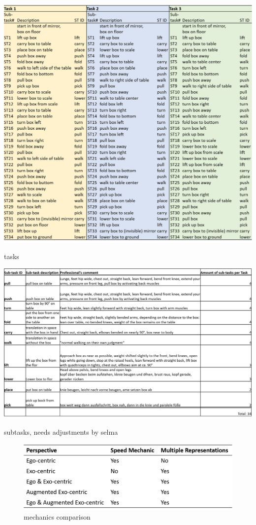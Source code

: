 \begin{table}[htb]
	\centering
	\includegraphics[width=\textwidth]{figures/tasks.png}
	\caption[Description of tasks]{tasks}
	\label{tab:tasks}
\end{table}

\begin{table}[htb]
	\centering
	\includegraphics[width=\textwidth]{figures/sub_tasks_definition.png}
	\caption[Description of sub-tasks]{subtasks, needs adjustments by selma}
	\label{tab:sub-tasks}
\end{table}

\begin{figure}[htb]
	\centering
	\includegraphics[width=\textwidth]{figures/mechanics_comparison.png}
	\caption[mechanics comparison]{mechanics comparison}
	\label{fig:mechanics_comparison}
\end{figure}

